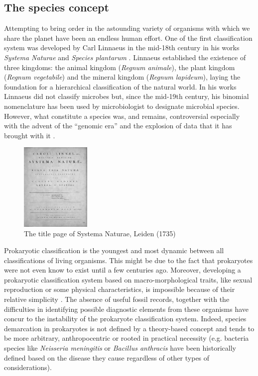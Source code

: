 \subsection{The species concept}
Attempting to bring order in the astounding variety of organisms with which we share the planet have been an endless human effort. One of the first classification system was developed by Carl Linnaeus in the mid-18th century in his works \textit{Systema Naturae} and \textit{Species plantarum} \cite{linnaeus1800species, bhl10277}. Linnaeus established the existence of three kingdoms: the animal kingdom (\textit{Regnum animale}), the plant kingdom (\textit{Regnum vegetabile}) and the mineral kingdom (\textit{Regnum lapideum}), laying the foundation for a hierarchical classification of the natural world. In his works Linnaeus did not classify microbes but, since the mid-19th century, his binomial nomenclature has been used by microbiologist to designate microbial species. However, what constitute a species was, and remains, controversial especially with the advent of the ``genomic era'' and the explosion of data that it has brought with it \cite{doolittle2006genomics}.\\%
\begin{figure}[!tb]
	\centering
	\includegraphics[width=0.3\textwidth]{./figures/Introduction/systema_naturae}
	\caption{The title page of Systema Naturae, Leiden (1735)}
\end{figure}%
Prokaryotic classification is the youngest and most dynamic between all classifications of living organisms. This might be due to the fact that prokaryotes were not even know to exist until a few centuries ago. Moreover, developing a prokaryotic classification system based on macro-morphological traits, like sexual reproduction or some physical characteristics, is impossible because of their relative simplicity \cite{cowan1965principles}. The absence of useful fossil records, together with the difficulties in identifying possible diagnostic elements from these organisms have concur to the instability of the prokaryote classification system. Indeed, species demarcation in prokaryotes is not defined by a theory-based concept and tends to be more arbitrary, anthropocentric or rooted in practical necessity (e.g. bacteria species like \textit{Neisseria meningitis} or \textit{Bacillus anthracis} have been historically defined based on the disease they cause regardless of other types of considerations).\\
